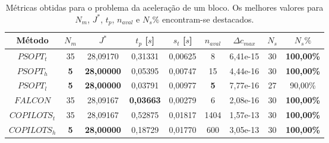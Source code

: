 \begin{table}
	\centering
	\caption[Métricas obtidas para o problema da aceleração de um bloco]{Métricas obtidas para o problema da aceleração de um bloco. Os melhores valores para $ N_m $, $ J^* $, $ t_p $, $ n_{aval} $ e $ N_s\% $ encontram-se destacados.}
	\label{tab:integrador:raw}
	\begin{tabular}{@{}ccccccccc@{}}
		\toprule
		Método       & $N_m$                             & $J^*$                                    & $t_p$ {[}$s${]}                         & $s_t$ {[}$s${]} & $n_{aval}$                        & $\Delta c_{max}$                         & $N_s$ & $N_s\%$                                  \\ \midrule
		$PSOPT_t$    & 35                                & 28,09170                                 & 0,31331                                 & 0,00625         & 8                                 & 6,41e-15                                 & 30    & {\color[HTML]{009901} \textbf{100,00\%}} \\
		$PSOPT_h$    & {\color[HTML]{009901} \textbf{5}} & {\color[HTML]{009901} \textbf{28,00000}} & 0,05395                                 & 0,00747         & 15                                & 4,44e-16                                 & 30    & {\color[HTML]{009901} \textbf{100,00\%}} \\
		$PSOPT_l$    & {\color[HTML]{009901} \textbf{5}} & {\color[HTML]{009901} \textbf{28,00000}} & 0,03791                                 & 0,00977         & {\color[HTML]{009901} \textbf{5}} & 7,77e-16                                 & 27    & 90,00\%                                  \\
		$FALCON$     & 35                                & 28,09167                                 & {\color[HTML]{009901} \textbf{0,03663}} & 0,00279         & 6                                 & 2,08e-16 & 30    & {\color[HTML]{009901} \textbf{100,00\%}} \\
		$COPILOTS_t$ & 35                                & 28,09167                                 & 0,52875                                 & 0,01817         & 1404                              & 1,57e-13                                 & 30    & {\color[HTML]{009901} \textbf{100,00\%}} \\
		$COPILOTS_h$ & {\color[HTML]{009901} \textbf{5}} & {\color[HTML]{009901} \textbf{28,00000}} & 0,18729                                 & 0,01770         & 600                               & 3,05e-13                                 & 30    & {\color[HTML]{009901} \textbf{100,00\%}} \\ \bottomrule
	\end{tabular}
\end{table}